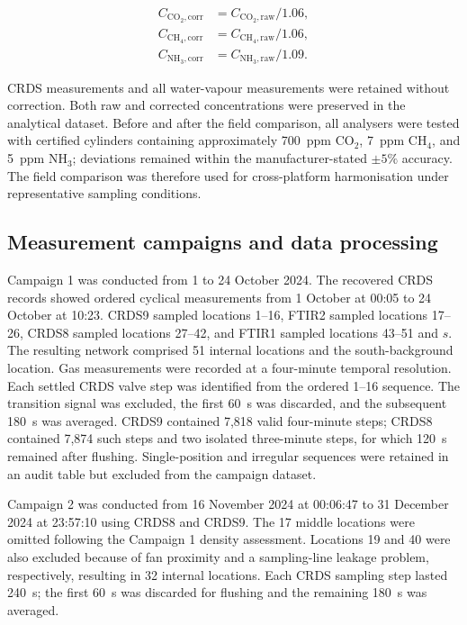 \documentclass[12pt,a4paper]{article}
\begin{document}
\begin{align}
C_{\mathrm{CO_2,corr}} &= C_{\mathrm{CO_2,raw}}/1.06,\\
C_{\mathrm{CH_4,corr}} &= C_{\mathrm{CH_4,raw}}/1.06,\\
C_{\mathrm{NH_3,corr}} &= C_{\mathrm{NH_3,raw}}/1.09.
\end{align}

CRDS measurements and all water-vapour measurements were retained without
correction. Both raw and corrected concentrations were preserved in the
analytical dataset. Before and after the field comparison, all analysers were
tested with certified cylinders containing approximately \SI{700}{ppm}
\(\mathrm{CO_2}\), \SI{7}{ppm} \(\mathrm{CH_4}\), and \SI{5}{ppm}
\(\mathrm{NH_3}\); deviations remained within the manufacturer-stated
\(\pm 5\%\) accuracy. The field comparison was therefore used for
cross-platform harmonisation under representative sampling conditions.

\subsection{Measurement campaigns and data processing}

Campaign 1 was conducted from 1 to 24 October 2024. The recovered CRDS records
showed ordered cyclical measurements from 1 October at 00:05 to 24 October at
10:23. CRDS9 sampled locations 1--16, FTIR2 sampled locations 17--26,
CRDS8 sampled locations 27--42, and FTIR1 sampled locations 43--51 and \(s\).
The resulting network comprised 51 internal locations and the
south-background location. Gas measurements were recorded at a four-minute
temporal resolution. Each settled CRDS valve step was identified from the
ordered 1--16 sequence. The transition signal was excluded, the first
\SI{60}{s} was discarded, and the subsequent \SI{180}{s} was averaged.
CRDS9 contained 7,818 valid four-minute steps; CRDS8 contained 7,874 such
steps and two isolated three-minute steps, for which \SI{120}{s} remained
after flushing. Single-position and irregular sequences were retained in an
audit table but excluded from the campaign dataset.

Campaign 2 was conducted from 16 November 2024 at 00:06:47 to 31 December
2024 at 23:57:10 using CRDS8 and CRDS9. The 17 middle locations were omitted
following the Campaign 1 density assessment. Locations 19 and 40 were also
excluded because of fan proximity and a sampling-line leakage problem,
respectively, resulting in 32 internal locations. Each CRDS sampling step
lasted \SI{240}{s}; the first \SI{60}{s} was discarded for flushing and the
remaining \SI{180}{s} was averaged.
\end{document}
